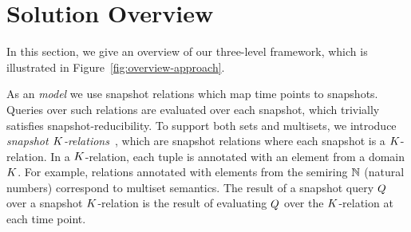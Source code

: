 \section{Solution Overview}
\label{sec:probl-stat-solut}

In this section, we give an overview of our three-level framework,
which is illustrated in Figure~\ref{fig:overview-approach}.
%

% 

\label{sec:conc-level-seuq}
%
As an \emph{ model} we use snapshot relations which map time
points to snapshots. Queries over such relations are evaluated over
each snapshot, which trivially satisfies snapshot-reducibility.  To
support both sets and multisets, we introduce
\emph{snapshot $K$-relations}~\cite{GK07}, which are
snapshot relations where each snapshot is a $K$-relation.  In a
$K$-relation, each tuple is annotated with an element from a
domain $K$. %
For example,
relations annotated with elements from the semiring ${\mathbb{N}}$ (natural
numbers) correspond to multiset semantics. %
%
The result of a snapshot query $Q$ over a snapshot
$K$-relation is the result of evaluating $Q$ over the
$K$-relation at each time point.

